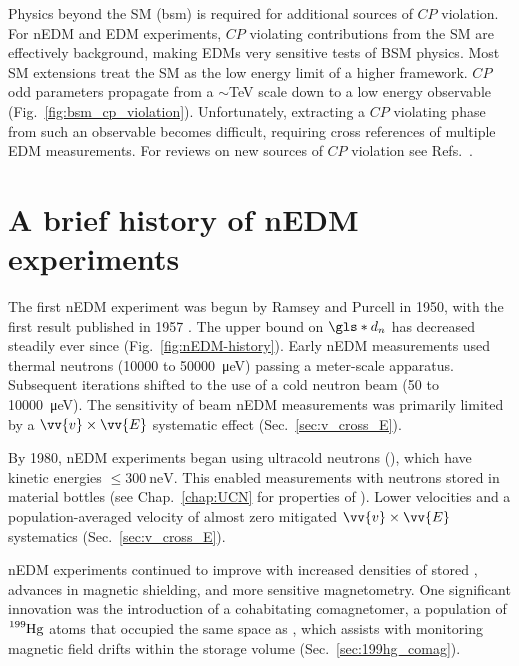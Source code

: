 Physics beyond the SM (\acrshort{bsm}) is required for additional sources of $CP$ violation. For nEDM and EDM experiments, $CP$ violating contributions from the SM are effectively background, making EDMs very sensitive tests of BSM physics. Most SM extensions treat the SM as the low energy limit of a higher framework. $CP$\textendash odd parameters propagate from a $\sim$\unit{\tera\eV} scale down to a low energy observable (Fig.~\ref{fig:bsm_cp_violation}). Unfortunately, extracting a $CP$ violating phase from such an observable becomes difficult, requiring cross references of multiple EDM measurements. For reviews on new sources of $CP$ violation see Refs.~\cite{Cir10, POS05, ENG13, CHU19}.


\section{A brief history of nEDM experiments}\label{sec:history_nedm}


The first nEDM experiment was begun by Ramsey and Purcell in 1950, with the first result published in 1957 \cite{ramsey_nedm_1950, ramsey_nedm_1957}. The upper bound on $\gls*{d_n}$ has decreased steadily ever since (Fig.~\ref{fig:nEDM-history}). Early nEDM measurements \cite{miller_nedm_1967, baird_nedm_1969, cohen_nedm_1969} used thermal neutrons (\num{10000} to \qty{50000}{\micro \eV}) passing a meter-scale apparatus. Subsequent iterations \cite{dress_nedm_1977} shifted to the use of a cold neutron beam (\num{50} to \qty{10000}{\micro \eV}). The sensitivity of beam nEDM measurements was primarily limited by a $\vv{v}\times\vv{E}$ systematic effect (Sec.~\ref{sec:v_cross_E}).

By 1980, nEDM experiments \cite{altarev_nedm_1980, altarev_nedm_1981} began using ultracold neutrons (\ucn), which have kinetic energies $\leq \qty{300}{\nano\eV}$. This enabled measurements with neutrons stored in material bottles \cite{smith_nedm_1990} (see Chap.~\ref{chap:UCN} for properties of \ucn). Lower \ucn velocities and a population-averaged velocity of almost zero mitigated $\vv{v}\times\vv{E}$ systematics (Sec.~\ref{sec:v_cross_E}). 

nEDM experiments continued to improve with increased densities of stored \ucn, advances in magnetic shielding, and more sensitive magnetometry. One significant innovation was the introduction of a cohabitating comagnetomer, a population of $\ce{^{199}Hg}$ atoms that occupied the same space as \ucn, which assists with monitoring magnetic field drifts within the storage volume (Sec.~\ref{sec:199hg_comag}). 

